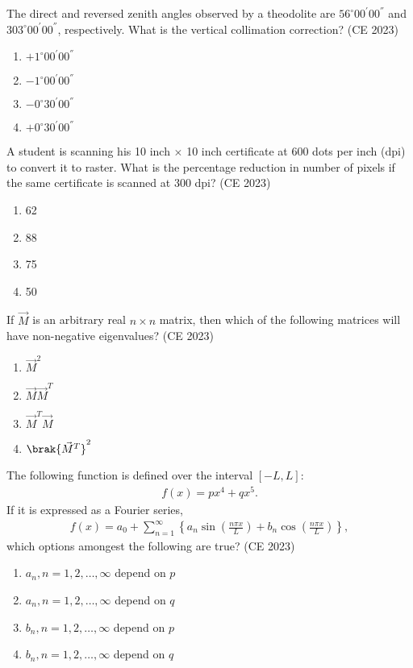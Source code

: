 \item The direct and reversed zenith angles observed by a theodolite are $56^{\circ} 00^{'} 00^{''}$ and
$303^{\circ} 00^{'} 00^{''}$, respectively. What is the vertical collimation correction?
\hfill{(CE 2023)}
\begin{enumerate}
\item $+1^{\circ} 00^{'} 00^{''}$
\item $-1^{\circ} 00^{'} 00^{''}$
\item $-0^{\circ} 30^{'} 00^{''}$
\item $+0^{\circ} 30^{'} 00^{''}$
\end{enumerate}
\item  A student is scanning his 10 inch $\times$ 10 inch certificate at 600 dots per inch (dpi) to
convert it to raster. What is the percentage reduction in number of pixels if the same
certificate is scanned at 300 dpi?
\hfill{(CE 2023)}
\begin{enumerate}
\item 62
\item 88
\item 75
\item 50
\end{enumerate}
\item If $\vec{M}$ is an arbitrary real $n\times n$ matrix, then which of the following matrices will
have non-negative eigenvalues?
\hfill{(CE 2023)}
\begin{enumerate}
\item $\vec{M}^2$
\item $\vec{M}\vec{M}^T$
\item $\vec{M}^T\vec{M}$
\item $\brak{\vec{M}^T}^2$
\end{enumerate}
\item The following function is defined over the interval $[-L, L]$:
\begin{align}
f(x) = px^4 + qx^5.
\end{align}
If it is expressed as a Fourier series,
\begin{align}
f(x) = a_0 + \sum_{n=1}^{\infty} \left\{ a_n \sin\left(\frac{n\pi x}{L}\right) + b_n \cos\left(\frac{n\pi x}{L}\right) \right\},
\end{align}
which options amongest the following are true?
\hfill{(CE 2023)}
\begin{enumerate}
\item $a_n, n = 1, 2, \dots, \infty$ depend on $p$
\item $a_n, n = 1, 2, \dots, \infty$ depend on $q$
\item $b_n, n = 1, 2, \dots, \infty$ depend on $p$
\item $b_n, n = 1, 2, \dots, \infty$ depend on $q$
\end{enumerate}

